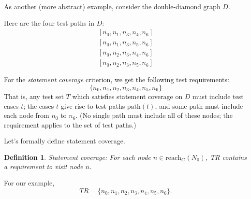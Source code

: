 \documentclass[11pt]{article}
\newtheorem{defn}{Definition}
\begin{document}
\newpage
As another (more abstract) example, consider the double-diamond graph $D$.
\begin{center}
\label{D}
\end{center}
Here are the four test paths in $D$:
\begin{eqnarray*}
&[n_0, n_1, n_3, n_4, n_6]& \\
&[n_0, n_1, n_3, n_5, n_6]& \\
&[n_0, n_2, n_3, n_4, n_6]& \\
&[n_0, n_2, n_3, n_5, n_6]&
\end{eqnarray*}

For the \emph{statement coverage} criterion, we get the following test requirements:
\[ \{ n_0, n_1, n_2, n_3, n_4, n_5, n_6 \} \]
That is, any test set $T$ which satisfies statement coverage on $D$ must include
test cases $t$; the cases $t$ give rise to test paths $\mbox{path}(t)$, and
some path must include each node from $n_0$ to $n_6$. (No single path must
include all of these nodes; the requirement applies to the set of
test paths.)

Let's formally define statement coverage.
\begin{defn}
Statement coverage: For each node $n \in \mbox{reach}_G(N_0)$, \emph{TR} contains
a requirement to visit node $n$.
\end{defn}

For our example,
\[ \mathit{TR} = \{ n_0, n_1, n_2, n_3, n_4, n_5, n_6\}. \]
\end{document}
